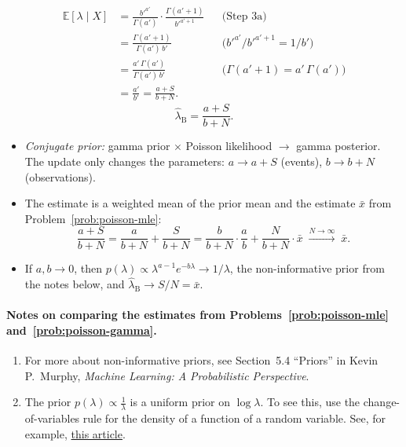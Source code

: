 \begin{solution}
\begin{align*}
  \mathbb{E}[\lambda \mid X]
  &= \frac{b'^{a'}}{\Gamma(a')} \cdot \frac{\Gamma(a' + 1)}{b'^{a' + 1}}
    && \text{(Step 3a)} \\
  &= \frac{\Gamma(a' + 1)}{\Gamma(a') \, b'}
    && \textstyle\text{($b'^{a'} / b'^{a' + 1} = 1 / b'$)} \\
  &= \frac{a' \, \Gamma(a')}{\Gamma(a') \, b'}
    && \text{($\Gamma(a' + 1) = a' \, \Gamma(a')$)} \\
  &= \frac{a'}{b'}
   = \frac{a + S}{b + N}.
\end{align*}
\[
  \hat{\lambda}_{\mathrm{B}} = \frac{a + S}{b + N}.
\]

\begin{itemize}
  \item \emph{Conjugate prior:} gamma prior $\times$ Poisson likelihood
    $\to$ gamma posterior. The update only changes the parameters:
    $a \to a + S$ (events), $b \to b + N$ (observations).
  \item The estimate is a weighted mean of the prior mean and the
    estimate $\bar{x}$ from Problem~\ref{prob:poisson-mle}:
    \[
      \frac{a + S}{b + N}
      = \frac{a}{b + N} + \frac{S}{b + N}
      = \frac{b}{b + N} \cdot \frac{a}{b}
      + \frac{N}{b + N} \cdot \bar{x}
      \;\xrightarrow{N \to \infty}\; \bar{x}.
    \]
  \item If $a, b \to 0$, then $p(\lambda) \propto \lambda^{a - 1}
    e^{-b\lambda} \to 1/\lambda$, the non-informative prior from the notes
    below, and $\hat{\lambda}_{\mathrm{B}} \to S/N = \bar{x}$.
\end{itemize}
\end{solution}

\paragraph{Notes on comparing the estimates from
  Problems~\ref{prob:poisson-mle} and~\ref{prob:poisson-gamma}.}
\begin{enumerate}[label=\arabic*.]
  \item For more about non-informative priors, see Section~5.4 ``Priors''
    in Kevin P.\ Murphy, \emph{Machine Learning: A Probabilistic
    Perspective}.
  \item The prior $p(\lambda) \propto \frac{1}{\lambda}$ is a uniform prior
    on $\log \lambda$. To see this, use the change-of-variables rule for
    the density of a function of a random variable. See, for example,
    \href{https://en.wikipedia.org/wiki/Probability_density_function#Function_of_random_variables_and_change_of_variables_in_the_probability_density_function}{this
    article}.
\end{enumerate}
